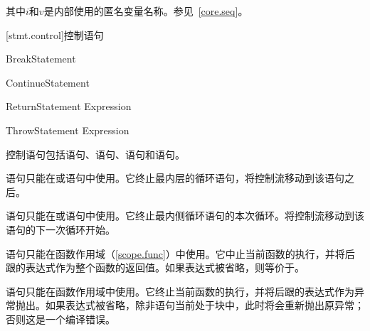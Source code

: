其中$i$和$v$是内部使用的匿名变量名称。参见~\ref{core.seq}。

[stmt.control]{控制语句}

\begin{bnf}{BreakStatement}
     \terminal{;}
\end{bnf}

\begin{bnf}{ContinueStatement}
     \terminal{;}
\end{bnf}

\begin{bnf}{ReturnStatement}
     Expression\bnfq \terminal{;}
\end{bnf}

\begin{bnf}{ThrowStatement}
     Expression\bnfq \terminal{;}
\end{bnf}

\pnum
控制语句包括语句、语句、语句和语句。

\pnum
{}语句只能在或语句中使用。它终止最内层的循环语句，将控制流移动到该语句之后。

\pnum
{}语句只能在或语句中使用。它终止最内侧循环语句的本次循环。将控制流移动到该语句的下一次循环开始。

\pnum
{}语句只能在函数作用域（\ref{scope.func}）中使用。它中止当前函数的执行，并将后跟的表达式作为整个函数的返回值。如果表达式被省略，则等价于\tcode{()}。

\pnum
{}语句只能在函数作用域中使用。它终止当前函数的执行，并将后跟的表达式作为异常抛出。如果表达式被省略，除非语句当前处于块中，此时将会重新抛出原异常；否则这是一个编译错误。

